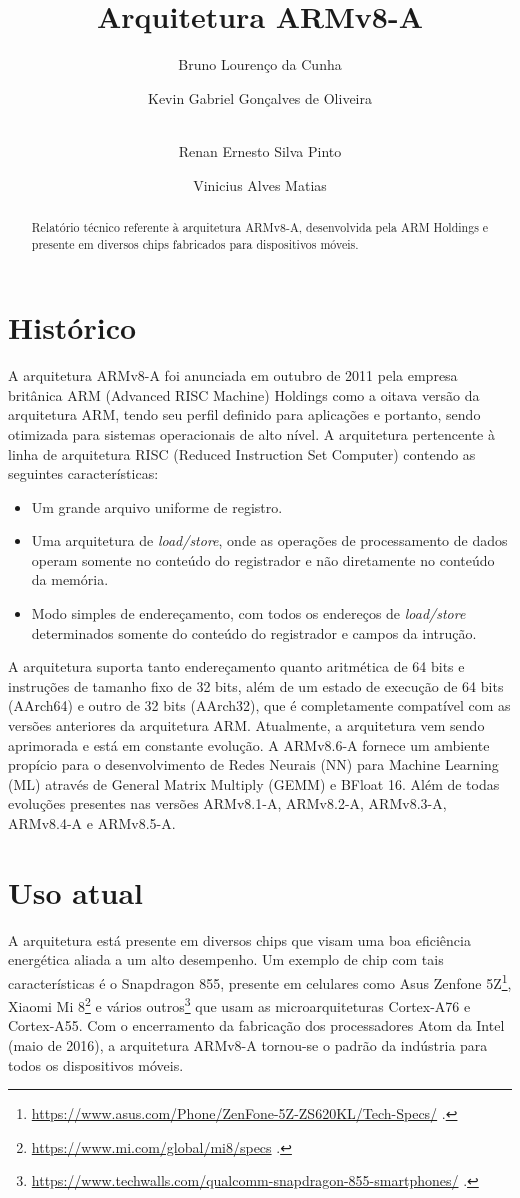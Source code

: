 \documentclass[12pt,a4paper,utf8]{ppgsi}
\title{Arquitetura ARMv8-A}
\author{Bruno Lourenço da Cunha\inst{1}
    \and Kevin Gabriel Gonçalves de Oliveira\inst{2}
    \and \\Renan Ernesto Silva Pinto\inst{3}
    \and Vinicius Alves Matias\inst{4}}
\begin{document}
\maketitle

\begin{abstract} 
    Relatório técnico referente à arquitetura ARMv8-A, desenvolvida pela ARM Holdings e presente em diversos chips fabricados para dispositivos móveis.
\end{abstract}

\section{Histórico}
    A arquitetura ARMv8-A foi anunciada em outubro de 2011 pela empresa britânica ARM (Advanced RISC Machine) Holdings como a oitava versão da arquitetura ARM, tendo seu perfil definido para aplicações e portanto, sendo otimizada para sistemas operacionais de alto nível. 
    A arquitetura pertencente à linha de arquitetura RISC (Reduced Instruction Set Computer) contendo as seguintes características:
    \begin{itemize}
      \item Um grande arquivo uniforme de registro.
      \item Uma arquitetura de \textit{load/store}, onde as operações de processamento de dados operam somente no conteúdo do registrador e não diretamente no conteúdo da memória.
      \item Modo simples de endereçamento, com todos os endereços de \textit{load/store} determinados somente do conteúdo do registrador e campos da intrução.
    \end{itemize}
    A arquitetura suporta tanto endereçamento quanto aritmética de 64 bits e instruções de tamanho fixo de 32 bits, além de um estado de execução de 64 bits (AArch64) e outro de 32 bits (AArch32), que é completamente compatível com as versões anteriores da arquitetura ARM.
    Atualmente, a arquitetura vem sendo aprimorada e está em constante evolução. A ARMv8.6-A fornece um ambiente propício para o desenvolvimento de Redes Neurais (NN) para Machine Learning (ML) através de General Matrix Multiply (GEMM) e BFloat 16. Além de todas evoluções presentes nas versões ARMv8.1-A, ARMv8.2-A, ARMv8.3-A, ARMv8.4-A e ARMv8.5-A.
    
   
 \section{Uso atual}
 A arquitetura está presente em diversos chips que visam uma boa eficiência energética aliada a um alto desempenho. Um exemplo de chip com tais características é o Snapdragon 855, presente em celulares como Asus Zenfone 5Z\footnote{\url{https://www.asus.com/Phone/ZenFone-5Z-ZS620KL/Tech-Specs/} .}, Xiaomi Mi 8\footnote{\url{https://www.mi.com/global/mi8/specs} .} e vários outros\footnote{\url{https://www.techwalls.com/qualcomm-snapdragon-855-smartphones/} .} que usam as microarquiteturas Cortex-A76 e Cortex-A55.
 Com o encerramento da fabricação dos processadores Atom da Intel (maio de 2016), a arquitetura ARMv8-A tornou-se o padrão da indústria para todos os dispositivos móveis.
 
\end{document}
